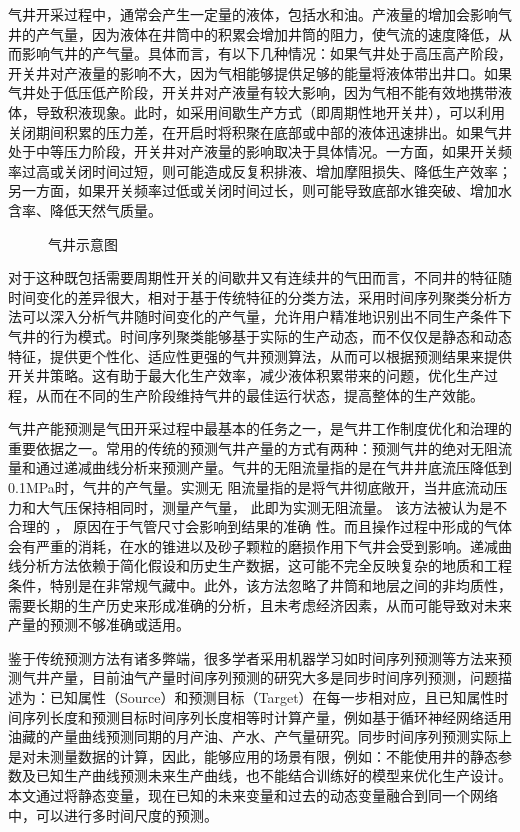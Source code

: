 气井开采过程中，通常会产生一定量的液体，包括水和油。产液量的增加会影响气井的产气量，因为液体在井筒中的积累会增加井筒的阻力，使气流的速度降低，从而影响气井的产气量。具体而言，有以下几种情况：如果气井处于高压高产阶段，开关井对产液量的影响不大，因为气相能够提供足够的能量将液体带出井口。如果气井处于低压低产阶段，开关井对产液量有较大影响，因为气相不能有效地携带液体，导致积液现象。此时，如采用间歇生产方式（即周期性地开关井），可以利用关闭期间积累的压力差，在开启时将积聚在底部或中部的液体迅速排出。如果气井处于中等压力阶段，开关井对产液量的影响取决于具体情况。一方面，如果开关频率过高或关闭时间过短，则可能造成反复积排液、增加摩阻损失、降低生产效率；另一方面，如果开关频率过低或关闭时间过长，则可能导致底部水锥突破、增加水含率、降低天然气质量。
\begin{figure}[H]
    \centering
    \caption{气井示意图}
\end{figure}
对于这种既包括需要周期性开关的间歇井又有连续井的气田而言，不同井的特征随时间变化的差异很大，相对于基于传统特征的分类方法，采用时间序列聚类分析方法可以深入分析气井随时间变化的产气量，允许用户精准地识别出不同生产条件下气井的行为模式。时间序列聚类能够基于实际的生产动态，而不仅仅是静态和动态特征，提供更个性化、适应性更强的气井预测算法，从而可以根据预测结果来提供开关井策略。这有助于最大化生产效率，减少液体积累带来的问题，优化生产过程，从而在不同的生产阶段维持气井的最佳运行状态，提高整体的生产效能。

气井产能预测是气田开采过程中最基本的任务之一，是气井工作制度优化和治理的重要依据之一。常用的传统的预测气井产量的方式有两种：预测气井的绝对无阻流量和通过递减曲线分析来预测产量。气井的无阻流量指的是在气井井底流压降低到0.1MPa时，气井的产气量。实测无
阻流量指的是将气井彻底敞开，当井底流动压力和大气压保持相同时，测量产气量， 此即为实测无阻流量。 该方法被认为是不合理的 ， 原因在于气管尺寸会影响到结果的准确
性。而且操作过程中形成的气体会有严重的消耗，在水的锥进以及砂子颗粒的磨损作用下气井会受到影响。递减曲线分析方法依赖于简化假设和历史生产数据，这可能不完全反映复杂的地质和工程条件，特别是在非常规气藏中。此外，该方法忽略了井筒和地层之间的非均质性，需要长期的生产历史来形成准确的分析，且未考虑经济因素，从而可能导致对未来产量的预测不够准确或适用。

鉴于传统预测方法有诸多弊端，很多学者采用机器学习如时间序列预测等方法来预测气井产量，目前油气产量时间序列预测的研究大多是同步时间序列预测，问题描述为：已知属性（Source）和预测目标（Target）在每一步相对应，且已知属性时间序列长度和预测目标时间序列长度相等时计算产量，例如基于循环神经网络适用油藏的产量曲线预测同期的月产油、产水、产气量研究。同步时间序列预测实际上是对未测量数据的计算，因此，能够应用的场景有限，例如：不能使用井的静态参数及已知生产曲线预测未来生产曲线，也不能结合训练好的模型来优化生产设计。
本文通过将静态变量，现在已知的未来变量和过去的动态变量融合到同一个网络中，可以进行多时间尺度的预测。


